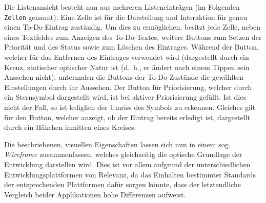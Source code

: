 \begin{itemize}
Die Listenansicht besteht nun aus mehreren Listeneinträgen (im Folgenden \texttt{Zellen} genannt). Eine Zelle ist für die Darstellung und Interaktion für genau einen To-Do-Eintrag zuständig. Um dies zu ermöglichen, besitzt jede Zelle, neben eines Textfeldes zum Anzeigen des To-Do-Textes, weitere Buttons zum Setzen der Priorität und des Status sowie zum Löschen des Eintrages. Während der Button, welcher für das Entfernen des Eintrages verwendet wird (dargestellt durch ein Kreuz, statischer optischer Natur ist (d.\ h., er ändert nach einem Tippen sein Aussehen nicht), untermalen die Buttons der To-Do-Zustände die gewählten Einstellungen durch ihr Aussehen. Der Button für Priorisierung, welcher durch ein Sternsymbol dargestellt wird, ist bei aktiver Priorisierung gefüllt. Ist dies nicht der Fall, so ist lediglich der Umriss des Symbols zu erkennen. Gleiches gilt für den Button, welcher anzeigt, ob der Eintrag bereits erledigt ist, dargestellt durch ein Häkchen inmitten eines Kreises.

Die beschriebenen, visuellen Eigenschaften lassen sich nun in einem sog. \textit{Wireframe} zusammenfassen, welches gleichzeitig die optische Grundlage der Entwicklung darstellen wird. Dies ist vor allem aufgrund der unterschiedlichen Entwicklungsplattformen von Relevanz, da das Einhalten bestimmter Standards der entsprechenden Plattformen dafür sorgen könnte, dass der letztendliche Vergleich beider Applikationen hohe Differenzen aufweist.


\end{itemize}
